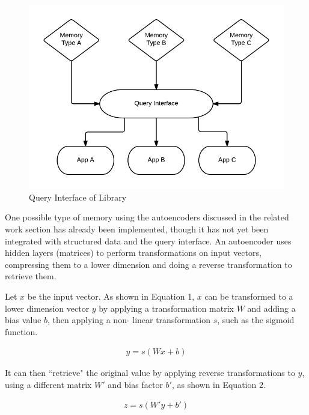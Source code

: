\documentclass{sig-alternate}
\begin{document}
\begin{figure}[h]
	\begin{center}
		\includegraphics[width=1\linewidth]{queryint}
	\end{center}
	\vspace{-12pt}
	\caption{Query Interface of Library}
	\label{fig:queryint}
\end{figure}

One possible type of memory using the autoencoders discussed in the related work
section has already been implemented, though it has not yet been integrated with
structured data and the query interface. An autoencoder uses hidden layers (matrices) to perform 
transformations on input vectors, compressing them to a lower dimension and doing a reverse 
transformation to retrieve them. 

Let $x$ be the input vector. As shown in Equation 1, $x$ can be transformed to a lower dimension 
vector $y$ by applying a transformation matrix $W$ and adding a bias value $b$, then applying a non-
linear transformation $s$, such as the sigmoid function.

\begin{gather}
y = s(Wx + b)
\end{gather}

It can then ``retrieve" the original value by applying reverse transformations to $y$, using
a different matrix $W'$ and bias factor $b'$, as shown in Equation 2.

\begin{gather}
z = s(W' y  + b')
\end{gather}
\end{document}
